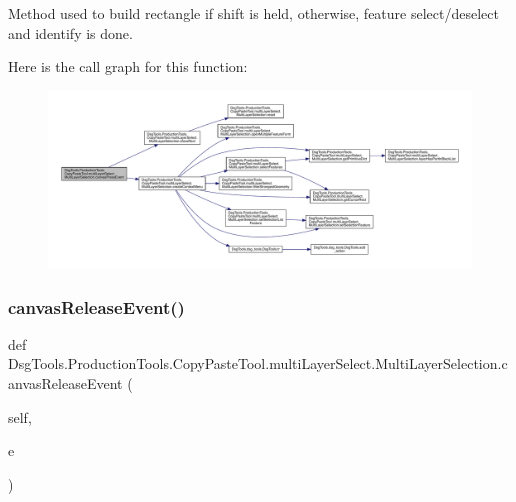 \begin{DoxyVerb}Method used to build rectangle if shift is held, otherwise, feature select/deselect and identify is done.
\end{DoxyVerb}
 Here is the call graph for this function\+:
\nopagebreak
\begin{figure}[H]
\begin{center}
\leavevmode
\includegraphics[width=350pt]{class_dsg_tools_1_1_production_tools_1_1_copy_paste_tool_1_1multi_layer_select_1_1_multi_layer_selection_a2d77fccb2d25bfe0b2247b938876d1d5_cgraph}
\end{center}
\end{figure}
\mbox{\label{class_dsg_tools_1_1_production_tools_1_1_copy_paste_tool_1_1multi_layer_select_1_1_multi_layer_selection_a0359b1a1412fceaf51d019a4721a42bd}} 
\subsubsection{\texorpdfstring{canvas\+Release\+Event()}{canvasReleaseEvent()}}
{\footnotesize\ttfamily def Dsg\+Tools.\+Production\+Tools.\+Copy\+Paste\+Tool.\+multi\+Layer\+Select.\+Multi\+Layer\+Selection.\+canvas\+Release\+Event (\begin{DoxyParamCaption}\item[{}]{self,  }\item[{}]{e }\end{DoxyParamCaption})}

